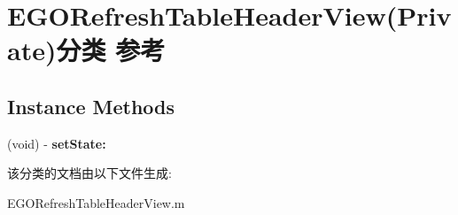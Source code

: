 \hypertarget{category_e_g_o_refresh_table_header_view_07_private_08}{\section{E\-G\-O\-Refresh\-Table\-Header\-View(Private)分类 参考}
\label{category_e_g_o_refresh_table_header_view_07_private_08}
}
\subsection*{Instance Methods}
\begin{DoxyCompactItemize}
\item 
\hypertarget{category_e_g_o_refresh_table_header_view_07_private_08_ad082392bbd824297918c74251a01e227}{(void) -\/ {\bfseries set\-State\-:}}\label{category_e_g_o_refresh_table_header_view_07_private_08_ad082392bbd824297918c74251a01e227}

\end{DoxyCompactItemize}


该分类的文档由以下文件生成\-:\begin{DoxyCompactItemize}
\item 
E\-G\-O\-Refresh\-Table\-Header\-View.\-m\end{DoxyCompactItemize}
